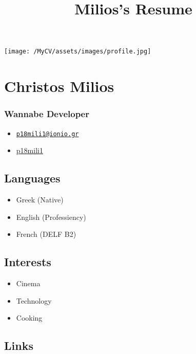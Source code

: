 \documentclass[english,]{article}
\title{Milios's Resume}
\date{}
\providecommand{\tightlist}{%
  \setlength{\itemsep}{0pt}\setlength{\parskip}{0pt}}
\begin{document}
\maketitle

\texttt{[image: /MyCV/assets/images/profile.jpg]}

\hypertarget{christos-milios}{%
\section{Christos Milios}\label{christos-milios}}

\hypertarget{wannabe-developer}{%
\subsubsection{Wannabe Developer}\label{wannabe-developer}}

\begin{itemize}
\tightlist
\item
  \emph{} \href{mailto:p18mili1@ionio.gr}{\nolinkurl{p18mili1@ionio.gr}}
\item
  \emph{} \href{http://github.com/p18mili1}{p18mili1}
\end{itemize}

\hypertarget{languages}{%
\subsection{Languages}\label{languages}}

\begin{itemize}
\tightlist
\item
  Greek {(Native)}
\item
  English {(Professiency)}
\item
  French {(DELF B2)}
\end{itemize}

\hypertarget{interests}{%
\subsection{Interests}\label{interests}}

\begin{itemize}
\tightlist
\item
  Cinema
\item
  Technology
\item
  Cooking
\end{itemize}

\hypertarget{links}{%
\subsection{Links}\label{links}}
\end{document}
